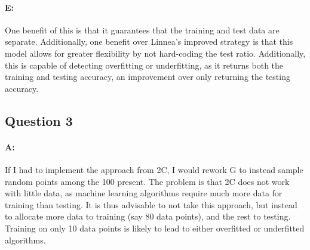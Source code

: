 \documentclass{article}
\begin{document}
\paragraph{E: } One benefit of this is that it guarantees that the training and test data are separate. Additionally, one benefit over Linnea's improved strategy is that this model allows for greater flexibility by not hard-coding the test ratio. Additionally, this is capable of detecting overfitting or underfitting, as it returns both the training and testing accuracy, an improvement over only returning the testing accuracy.

\subsection{Question 3}

\paragraph{A: } If I had to implement the approach from 2C, I would rework G to instead sample random points among the 100 present. The problem is that 2C does not work with little data, as machine learning algorithms require much more data for training than testing. It is thus advisable to not take this approach, but instead to allocate more data to training (say 80 data points), and the rest to testing. Training on only 10 data points is likely to lead to either overfitted or underfitted algorithms.
\end{document}
